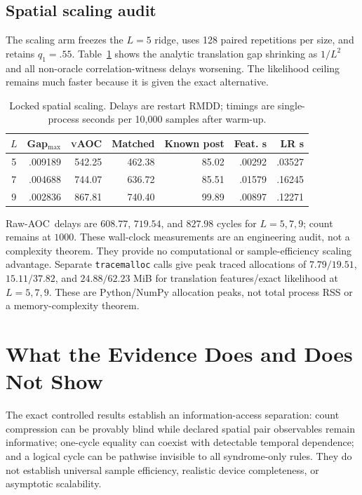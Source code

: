 \documentclass[letterpaper,journal]{IEEEtran}
\newcommand{\AOC}{\textsc{AOC}}
\newcommand{\vAOC}{\textsc{vAOC}}
\begin{document}
\subsection{Spatial scaling audit}

The scaling arm freezes the $L=5$ ridge, uses 128 paired repetitions per
size, and retains $q_1=.55$. Table~\ref{tab:scaling} shows the analytic
translation gap shrinking as $1/L^2$ and all non-oracle correlation-witness
delays worsening. The likelihood ceiling remains much faster because it is
given the exact alternative.

\begin{table}[t]
\centering
\scriptsize
\caption{Locked spatial scaling. Delays are restart RMDD; timings are
single-process seconds per 10,000 samples after warm-up.}
\label{tab:scaling}
\begin{tabular}{@{}crrrrrr@{}}
\toprule
$L$ & Gap$_{\max}$ & \vAOC & Matched & Known post & Feat. s & LR s\\
\midrule
5 & .009189 & 542.25 & 462.38 & 85.02 & .00292 & .03527\\
7 & .004688 & 744.07 & 636.72 & 85.51 & .01579 & .16245\\
9 & .002836 & 867.81 & 740.40 & 99.89 & .00897 & .12271\\
\bottomrule
\end{tabular}
\end{table}

Raw-\AOC\ delays are $608.77$, $719.54$, and $827.98$ cycles for
$L=5,7,9$; count remains at $1000$. These wall-clock measurements are an
engineering audit, not a complexity theorem. They provide no computational or
sample-efficiency scaling advantage. Separate \texttt{tracemalloc} calls give
peak traced allocations of $7.79/19.51$, $15.11/37.82$, and
$24.88/62.23$ MiB for translation features/exact likelihood at
$L=5,7,9$. These are Python/NumPy allocation peaks, not total process RSS or
a memory-complexity theorem.

\clearpage

\section{What the Evidence Does and Does Not Show}

The exact controlled results establish an information-access separation:
count compression can be provably blind while declared spatial pair
observables remain informative; one-cycle equality can coexist with
detectable temporal dependence; and a logical cycle can be pathwise invisible
to all syndrome-only rules. They do not establish universal sample
efficiency, realistic device completeness, or asymptotic scalability.
\end{document}
